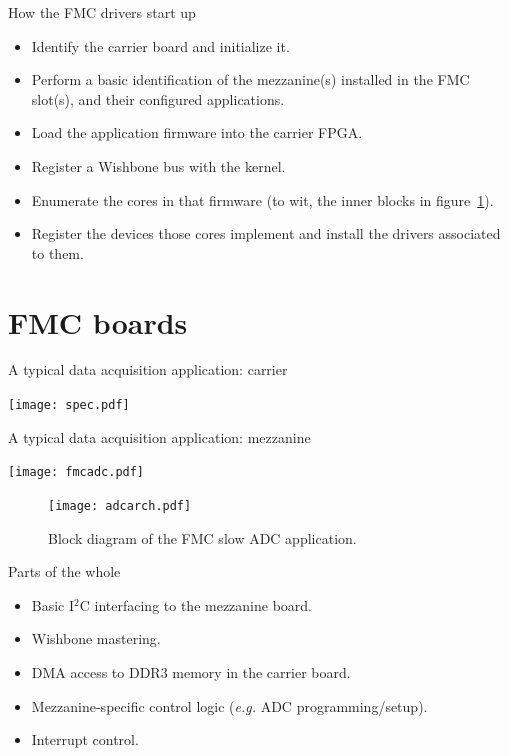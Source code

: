 \documentclass[compress,red]{beamer}
\begin{document}
\begin{frame}{How the FMC drivers start up}
\begin{itemize}
\item Identify the carrier board and initialize it.
\item Perform a basic identification of the mezzanine(s) installed in
    the FMC slot(s), and their configured applications.
\item Load the application firmware into the carrier FPGA.
\item Register a Wishbone bus with the kernel.
\item Enumerate the cores in that firmware (to wit, the
    inner blocks in figure~\ref{slow-adc}).
\item Register the devices those cores implement and install the drivers
    associated to them.
\end{itemize}
\end{frame}

\section{FMC boards}

\begin{frame}{A typical data acquisition application: carrier}
\begin{center}
\texttt{[image: spec.pdf]}
\end{center}
\end{frame}

\begin{frame}{A typical data acquisition application: mezzanine}
\begin{center}
\texttt{[image: fmcadc.pdf]}
\end{center}
\end{frame}

\begin{frame}
\begin{figure}[t]
   \centering
   \texttt{[image: adcarch.pdf]}
   \caption{Block diagram of the FMC slow ADC application.}
   \label{slow-adc}
\end{figure}
\end{frame}

\begin{frame}{Parts of the whole}
\begin{itemize}
\item Basic I${}^2$C interfacing to the mezzanine board.
\item Wishbone mastering.
\item DMA access to DDR3 memory in the carrier board.
\item Mezzanine-specific control logic (\emph{e.g.} ADC programming/setup).
\item Interrupt control.
\end{itemize}
\end{frame}
\end{document}
